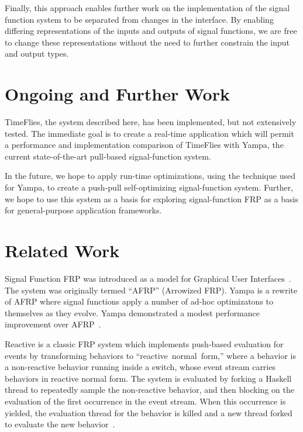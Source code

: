\documentclass[draft]{llncs}
\begin{document}
Finally, this approach enables further work on the implementation of the signal
function system to be separated from changes in the interface. By enabling
differing representations of the inputs and outputs of signal functions, we are
free to change these representations without the need to further constrain the
input and output types.

\section{Ongoing and Further Work}
\label{section:Ongoing_and_Further_Work}

TimeFlies, the system described here, has been implemented, but not
extensively tested. The immediate goal is to create a real-time application
which will permit a performance and implementation comparison of TimeFlies with
Yampa, the current state-of-the-art pull-based signal-function system.

In the future, we hope to apply run-time optimizations, using the technique used
for Yampa, to create a push-pull self-optimizing signal-function system. Further,
we hope to use this system as a basis for exploring signal-function FRP as a
basis for general-purpose application frameworks.

\section{Related Work}
\label{section:Related_Work}

Signal Function FRP was introduced as a model for Graphical User Interfaces~\cite{Courtney2001-1}.
The system was originally termed ``AFRP'' (Arrowized FRP). Yampa is a rewrite of
AFRP where signal functions apply a number of ad-hoc optimizatons to themselves
as they evolve. Yampa demonstrated a modest performance improvement
over AFRP~\cite{Nilsson2005}.

Reactive is a classic FRP system which implements push-based evaluation for events
by transforming behaviors to ``reactive~normal~form,'' where a behavior
is a non-reactive behavior running inside a switch, whose event stream carries
behaviors in reactive normal form. The system is evaluated by forking a Haskell
thread to repeatedly sample the non-reactive behavior, and then blocking on the
evaluation of the first occurrence in the event stream. When this occurrence
is yielded, the evaluation thread for the behavior is killed and a new
thread forked to evaluate the new behavior~\cite{Elliott2009}.
\end{document}
